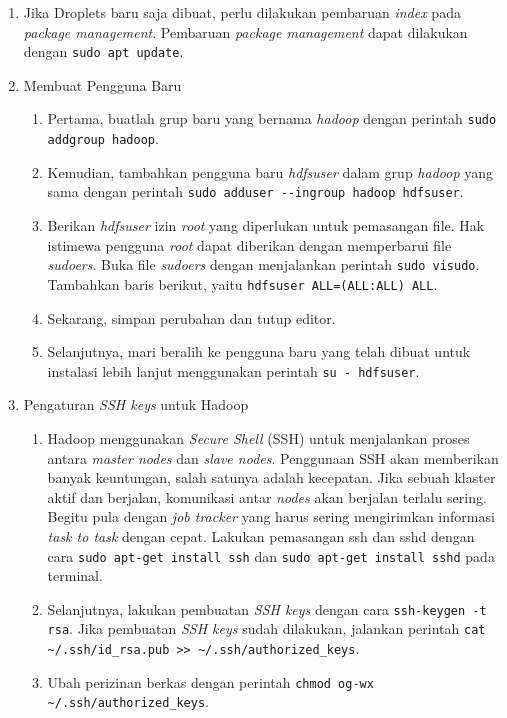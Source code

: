 \begin{enumerate}
  \item Jika Droplets baru saja dibuat, perlu dilakukan pembaruan \textit{index} pada \textit{package management}. Pembaruan \textit{package management} dapat dilakukan dengan \verb|sudo apt update|. 
  \item Membuat Pengguna Baru   \begin{enumerate}
    \item Pertama, buatlah grup baru yang bernama \textit{hadoop} dengan perintah \verb|sudo addgroup hadoop|.
    \item Kemudian, tambahkan pengguna baru \textit{hdfsuser} dalam grup \textit{hadoop} yang sama dengan perintah \verb|sudo adduser --ingroup hadoop hdfsuser|.
    \item Berikan \textit{hdfsuser} izin \textit{root} yang diperlukan untuk pemasangan file. Hak istimewa pengguna \textit{root} dapat diberikan dengan memperbarui file \textit{sudoers}. Buka file \textit{sudoers} dengan menjalankan perintah \verb|sudo visudo|. Tambahkan baris berikut, yaitu \verb|hdfsuser ALL=(ALL:ALL) ALL|.
    \item Sekarang, simpan perubahan dan tutup editor.
    \item Selanjutnya, mari beralih ke pengguna baru yang telah dibuat untuk instalasi lebih lanjut menggunakan perintah \verb|su - hdfsuser|.
  \end{enumerate}
  \item Pengaturan \textit{SSH keys} untuk Hadoop
  \begin{enumerate}
  	\item Hadoop menggunakan \textit{Secure Shell} (SSH) untuk menjalankan proses antara \textit{master nodes} dan \textit{slave nodes}. Penggunaan SSH akan memberikan banyak keuntungan, salah satunya adalah kecepatan. Jika sebuah klaster aktif dan berjalan, komunikasi antar \textit{nodes} akan berjalan terlalu sering. Begitu pula dengan \textit{job tracker} yang harus sering mengirimkan informasi \textit{task to task} dengan cepat. Lakukan pemasangan ssh dan sshd dengan cara \verb|sudo apt-get install ssh| dan \verb|sudo apt-get install sshd| pada terminal.
    \item Selanjutnya, lakukan pembuatan \textit{SSH keys} dengan cara \verb|ssh-keygen -t rsa|. Jika pembuatan \textit{SSH keys} sudah dilakukan, jalankan perintah \verb|cat ~/.ssh/id_rsa.pub >> ~/.ssh/authorized_keys|.
    \item Ubah perizinan berkas dengan perintah \verb|chmod og-wx ~/.ssh/authorized_keys|.

\end{enumerate}
\end{enumerate}
